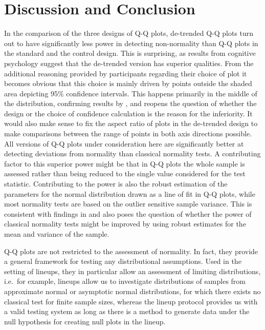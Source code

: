 \documentclass{article}\usepackage[]{graphicx}\usepackage[]{color}
\begin{document}
\section{Discussion and Conclusion}\label{sec:discussion}
In the comparison of the three designs of Q-Q plots, de-trended Q-Q plots turn out to have significantly less power in detecting non-normality than Q-Q plots in the standard and the control design. This is surprising, as results from cognitive psychology suggest that the de-trended version has superior qualities. From the additional reasoning provided by participants regarding their choice of plot it becomes obvious that this choice is mainly driven by points outside the shaded area depicting 95\% confidence intervals. This happens primarily in the middle of the distribution, confirming results by \citet{buja:2013}, and reopens the question of whether the design or the choice of confidence calculation is the reason for the inferiority. It would also make sense to fix the aspect ratio of plots in the de-trended design to make comparisons between the range of points in both axis directions possible.
All versions of Q-Q plots under consideration here are significantly better at detecting deviations from normality than classical normality tests. A contributing factor to this superior power might be  that in  Q-Q plots the whole sample is assessed rather than being reduced to the single value considered for the test statistic. 
Contributing to the power is also the robust estimation of the parameters for the normal distribution drawn as a line of fit in  Q-Q plots, while most normality tests are based on the outlier sensitive sample variance. %
This is consistent with findings in \citet{buja:2013} and  also poses the question of whether the power of classical normality tests might  be improved by using robust estimates for the mean and variance of the sample.

Q-Q plots are not restricted to the assessment of normality. In fact, they provide a general framework for testing any distributional assumptions. Used in the setting of lineups, they in particular allow an assessment of limiting distributions, i.e.~for example, lineups allow us to investigate distributions of
 samples from approximate normal or asymptotic normal distributions, for which  there exists  no classical test for finite sample sizes, whereas the lineup protocol provides us with a valid testing system
  as long as there is a method  to generate data under the null hypothesis for creating null plots in the lineup.
 
\end{document}
